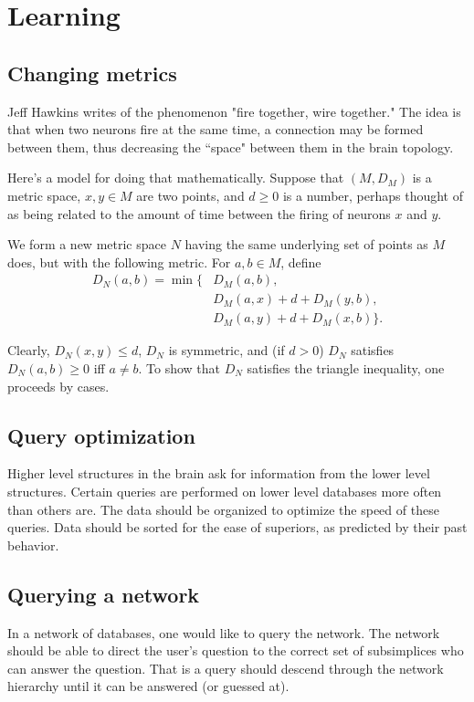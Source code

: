 \documentclass{amsart}
\begin{document}
\section{Learning}

\subsection{Changing metrics}

Jeff Hawkins writes of the phenomenon "fire together, wire together."  The idea is that when two neurons fire at the same time, a connection may be formed between them, thus decreasing the ``space" between them in the brain topology.

Here's a model for doing that mathematically.  Suppose that $(M,D_M)$ is a metric space, $x,y\in M$ are two points, and $d\geq 0$ is a number, perhaps thought of as being related to the amount of time between the firing of neurons $x$ and $y$.

We form a new metric space $N$ having the same underlying set of points as $M$ does, but with the following metric.  For $a,b\in M$, define \begin{align*}D_N(a,b)=\min\{&D_M(a,b),\\&D_M(a,x)+d+D_M(y,b),\\&D_M(a,y)+d+D_M(x,b)\}.\end{align*}

Clearly, $D_N(x,y)\leq d$, $D_N$ is symmetric, and (if $d>0$) $D_N$ satisfies $D_N(a,b)\geq 0$ iff $a\neq b$.  To show that $D_N$ satisfies the triangle inequality, one proceeds by cases.

\subsection{Query optimization}

Higher level structures in the brain ask for information from the lower level structures.  Certain queries are performed on lower level databases more often than others are.  The data should be organized to optimize the speed of these queries.  Data should be sorted for the ease of superiors, as predicted by their past behavior.

\subsection{Querying a network}

In a network of databases, one would like to query the network.  The network should be able to direct the user's question to the correct set of subsimplices who can answer the question.  That is a query should descend through the network hierarchy until it can be answered (or guessed at).  
\end{document}
